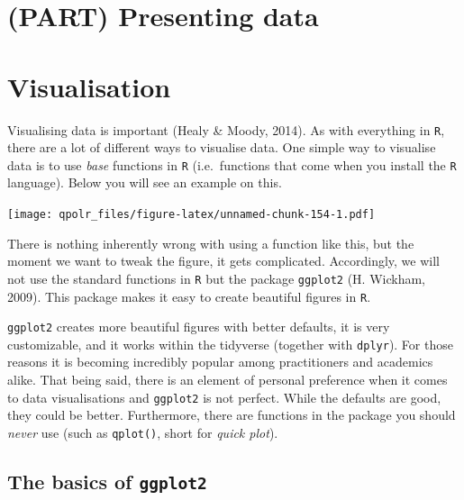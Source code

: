 \documentclass[12pt,oneside]{reedthesis}
\theoremstyle{definition}
\theoremstyle{definition}
\theoremstyle{definition}
\theoremstyle{remark}
\begin{document}
  \chapter*{(PART) Presenting data}\label{part-presenting-data}
  
  \chapter{Visualisation}\label{dataviz}
  
  Visualising data is important (Healy \& Moody, 2014). As with everything
  in \texttt{R}, there are a lot of different ways to visualise data. One
  simple way to visualise data is to use \emph{base} functions in
  \texttt{R} (i.e.~functions that come when you install the \texttt{R}
  language). Below you will see an example on this.
  \begin{Shaded}
  \begin{Highlighting}[]
  \NormalTok{(}\OperatorTok{$}\OperatorTok{$}
  \end{Highlighting}
  \end{Shaded}
  \texttt{[image: qpolr\_files/figure-latex/unnamed-chunk-154-1.pdf]}
  
  There is nothing inherently wrong with using a function like this, but
  the moment we want to tweak the figure, it gets complicated.
  Accordingly, we will not use the standard functions in \texttt{R} but
  the package \texttt{ggplot2} (H. Wickham, 2009). This package makes it
  easy to create beautiful figures in \texttt{R}.
  
  \texttt{ggplot2} creates more beautiful figures with better defaults, it
  is very customizable, and it works within the tidyverse (together with
  \texttt{dplyr}). For those reasons it is becoming incredibly popular
  among practitioners and academics alike. That being said, there is an
  element of personal preference when it comes to data visualisations and
  \texttt{ggplot2} is not perfect. While the defaults are good, they could
  be better. Furthermore, there are functions in the package you should
  \emph{never} use (such as \texttt{qplot()}, short for \emph{quick
  plot}).
  
  \section{\texorpdfstring{The basics of
  \texttt{ggplot2}}{The basics of ggplot2}}\label{the-basics-of-ggplot2}
  
\end{document}
